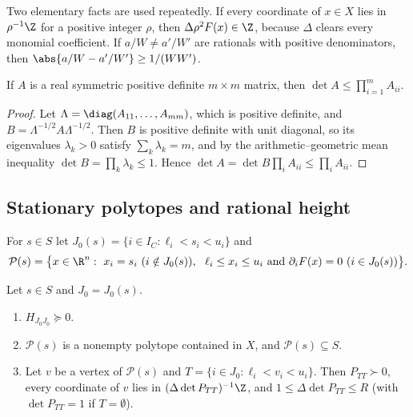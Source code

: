 Two elementary facts are used repeatedly. If every coordinate of $x\in X$
lies in $\rho^{-1}\Z$ for a positive integer $\rho$, then
$\Delta\rho^2F(x)\in\Z$, because $\Delta$ clears every monomial coefficient. If
$a/W\ne a'/W'$ are rationals with positive denominators, then
$\abs{a/W-a'/W'}\ge1/(WW')$.

\begin{lemma}\label{lem:hadamard}
If $A$ is a real symmetric positive definite $m\times m$ matrix, then
$\det A\le\prod_{i=1}^mA_{ii}$.
\end{lemma}

\begin{proof}
Let $\Lambda=\diag(A_{11},\dots,A_{mm})$, which is positive definite, and
$B=\Lambda^{-1/2}A\Lambda^{-1/2}$. Then $B$ is positive definite with unit
diagonal, so its eigenvalues $\lambda_k>0$ satisfy $\sum_k\lambda_k=m$, and
by the arithmetic--geometric mean inequality
$\det B=\prod_k\lambda_k\le1$. Hence
$\det A=\det B\prod_iA_{ii}\le\prod_iA_{ii}$.
\end{proof}

\subsection{Stationary polytopes and rational height}

\begin{definition}\label{def:statpoly}
For $s\in S$ let $J_0(s)=\{i\in I_C:\ell_i<s_i<u_i\}$ and
\[
\mathcal P(s)=\bigl\{x\in\R^n:\ x_i=s_i\ (i\notin J_0(s)),\ \
\ell_i\le x_i\le u_i\ \text{and}\ \partial_iF(x)=0\ (i\in J_0(s))\bigr\}.
\]
\end{definition}

\begin{lemma}[Stationary polytopes]\label{lem:statpoly}
Let $s\in S$ and $J_0=J_0(s)$.
\begin{enumerate}[label=(\alph*)]
\item $H_{J_0J_0}\succeq0$.
\item $\mathcal P(s)$ is a nonempty polytope contained in $X$, and
$\mathcal P(s)\subseteq S$.
\item Let $v$ be a vertex of $\mathcal P(s)$ and
$T=\{i\in J_0:\ell_i<v_i<u_i\}$. Then $P_{TT}\succ0$, every coordinate of $v$
lies in $(\Delta\det P_{TT})^{-1}\Z$, and $1\le \Delta\det P_{TT}\le R$ (with
$\det P_{TT}=1$ if $T=\emptyset$).
\end{enumerate}
\end{lemma}

